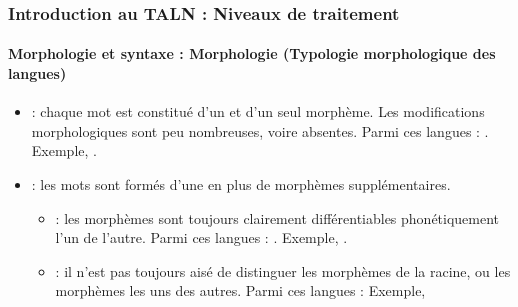 \documentclass[xcolor=table]{beamer}
\begin{document}
\begin{frame}
\frametitle{Introduction au TALN : Niveaux de traitement}
\framesubtitle{Morphologie et syntaxe : Morphologie (Typologie morphologique des langues)}

\begin{itemize}
	\item {} : chaque mot est constitué d'un et d'un seul morphème. Les modifications morphologiques sont peu nombreuses, voire absentes. Parmi ces langues : . Exemple, .
	\item {} : les mots sont formés d'une  en plus de morphèmes supplémentaires.
	\begin{itemize}
		\item {} : les morphèmes sont toujours clairement différentiables phonétiquement l'un de l'autre. Parmi ces langues : . Exemple, .
		\item {} : il n'est pas toujours aisé de distinguer les morphèmes de la racine, ou les morphèmes les uns des autres. Parmi ces langues :  Exemple, 
	\end{itemize}
\end{itemize}

\end{frame}
\end{document}
